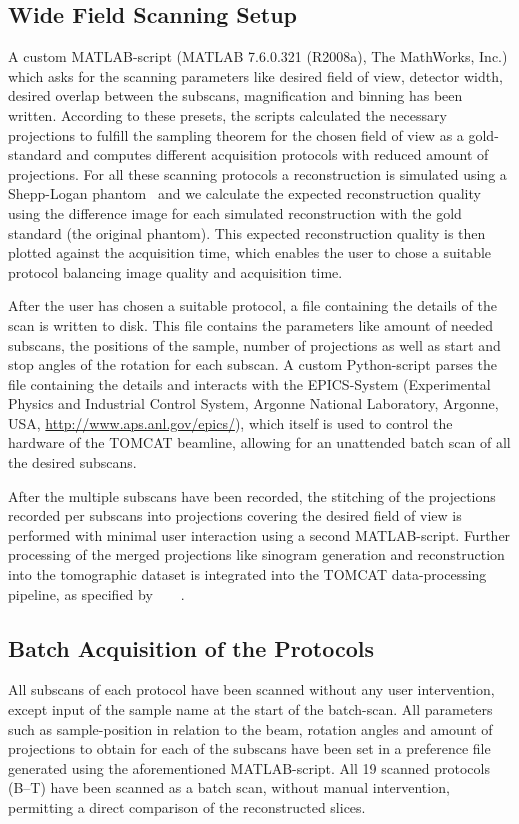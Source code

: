 \subsection{Wide Field Scanning Setup}%
\label{subsec:wfs-setup}%
A custom MATLAB-script (MATLAB\textsuperscript{\textregistered} 7.6.0.321 (R2008a), The MathWorks, Inc.) which asks for the scanning parameters like desired field of view, detector width, desired overlap between the subscans, magnification and binning has been written. According to these presets, the scripts calculated the necessary projections to fulfill the sampling theorem for the chosen field of view as a gold-standard and computes different acquisition protocols with reduced amount of projections. For all these scanning protocols a reconstruction is simulated using a Shepp-Logan phantom~\cite{Shepp1974} and we calculate the expected reconstruction quality using the difference image for each simulated reconstruction with the gold standard (the original phantom). This expected reconstruction quality is then plotted against the acquisition time, which enables the user to chose a suitable protocol balancing image quality and acquisition time.

After the user has chosen a suitable protocol, a file containing the details of the scan is written to disk. This file contains the parameters like amount of needed subscans, the positions of the sample, number of projections as well as start and stop angles of the rotation for each subscan. A custom Python-script parses the file containing the details and interacts with the EPICS-System (Experimental Physics and Industrial Control System, Argonne National Laboratory, Argonne, USA, \url{http://www.aps.anl.gov/epics/}), which itself is used to control the hardware of the TOMCAT beamline, allowing for an unattended batch scan of all the desired subscans.

After the multiple subscans have been recorded, the stitching of the projections recorded per subscans into projections covering the desired field of view is performed with minimal user interaction using a second MATLAB-script. Further processing of the merged projections like sinogram generation and reconstruction into the tomographic dataset is integrated into the TOMCAT data-processing pipeline, as specified by%
\ifhtml%
	~\citet{Hintermueller2009}%
\else%
	~%
\fi%
.

\subsection{Batch Acquisition of the Protocols}%
All subscans of each protocol have been scanned without any user intervention, except input of the sample name at the start of the batch-scan. All parameters such as sample-position in relation to the beam, rotation angles and amount of projections to obtain for each of the subscans have been set in a preference file generated using the aforementioned MATLAB-script. All 19 scanned protocols (B--T) have been scanned as a batch scan, without manual intervention, permitting a direct comparison of the reconstructed slices.

